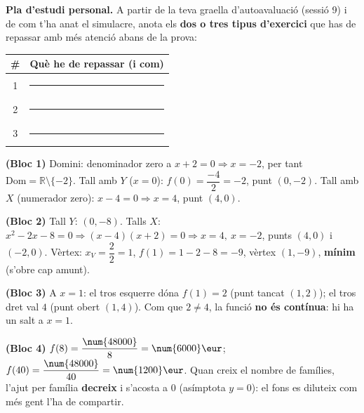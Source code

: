 \noindent\textbf{Pla d'estudi personal.} A partir de la teva graella
d'autoavaluació (sessió 9) i de com t'ha anat el simulacre, anota els \textbf{dos o
tres tipus d'exercici} que has de repassar amb més atenció abans de la prova:
\begin{center}
\renewcommand{\arraystretch}{1.5}
\begin{tabular}{c p{10.5cm}}
\toprule
\textbf{\#} & \textbf{Què he de repassar (i com)} \\
\midrule
1 & \rule{9.8cm}{0.4pt} \\
2 & \rule{9.8cm}{0.4pt} \\
3 & \rule{9.8cm}{0.4pt} \\
\bottomrule
\end{tabular}
\end{center}

\begin{solucions}
\begin{sollist}
  \item \textbf{(Bloc 1)} Domini: denominador zero a $x+2=0 \Rightarrow x=-2$, per
        tant $\mathrm{Dom}=\mathbb{R}\setminus\{-2\}$. Tall amb $Y$ ($x=0$):
        $f(0)=\dfrac{-4}{2}=-2$, punt $(0,-2)$. Tall amb $X$ (numerador zero):
        $x-4=0 \Rightarrow x=4$, punt $(4,0)$.
  \item \textbf{(Bloc 2)} Tall $Y$: $(0,-8)$. Talls $X$: $x^2-2x-8=0
        \Rightarrow (x-4)(x+2)=0 \Rightarrow x=4,\ x=-2$, punts $(4,0)$ i $(-2,0)$.
        Vèrtex: $x_V=\dfrac{2}{2}=1$, $f(1)=1-2-8=-9$, vèrtex $(1,-9)$, \textbf{mínim}
        (s'obre cap amunt).
  \item \textbf{(Bloc 3)} A $x=1$: el tros esquerre dóna $f(1)=2$ (punt tancat
        $(1,2)$); el tros dret val $4$ (punt obert $(1,4)$). Com que $2\neq 4$, la
        funció \textbf{no és contínua}: hi ha un salt a $x=1$.
  \item \textbf{(Bloc 4)} $f(8)=\dfrac{\num{48000}}{8}=\num{6000}\eur$;
        $f(40)=\dfrac{\num{48000}}{40}=\num{1200}\eur$. Quan creix el nombre de
        famílies, l'ajut per família \textbf{decreix} i s'acosta a $0$ (asímptota
        $y=0$): el fons es diluteix com més gent l'ha de compartir.
\end{sollist}
\end{solucions}
